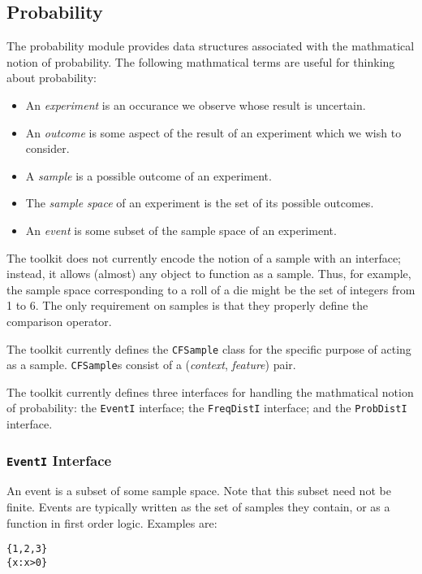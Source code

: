 \documentclass{article}
\begin{document}
\subsection{Probability}

The probability module provides data structures associated with the
mathmatical notion of probability.  The following mathmatical terms
are useful for thinking about probability:

\begin{itemize}
  \item An \emph{experiment} is an occurance we observe whose result 
        is uncertain.
  \item An \emph{outcome} is some aspect of the result of an
        experiment which we wish to consider.
  \item A \emph{sample} is a possible outcome of an experiment.
  \item The \emph{sample space} of an experiment is the set of its
        possible outcomes.
  \item An \emph{event} is some subset of the sample space of an
        experiment. 
\end{itemize}

The toolkit does not currently encode the notion of a sample with an
interface; instead, it allows (almost) any object to function as a
sample.  Thus, for example, the sample space corresponding to a roll
of a die might be the set of integers from 1 to 6.  The only
requirement on samples is that they properly define the comparison
operator. 

The toolkit currently defines the \texttt{CFSample} class for the
specific purpose of acting as a sample.  \texttt{CFSample}s consist of 
a (\emph{context}, \emph{feature}) pair.

The toolkit currently defines three interfaces for handling the
mathmatical notion of probability: the \texttt{EventI} interface; the
\texttt{FreqDistI} interface; and the \texttt{ProbDistI} interface.

\subsubsection{\texttt{EventI} Interface}

    An event is a subset of some sample space.  Note that this subset
    need not be finite.  Events are typically written as the set of
    samples they contain, or as a function in first order logic.
    Examples are:

\begin{verbatim}
{1,2,3}
{x:x>0}
\end{verbatim}
\end{document}
